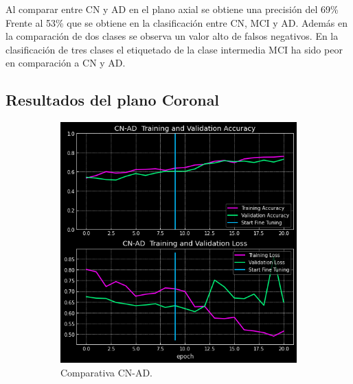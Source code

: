 Al comparar entre CN y AD en el plano axial se obtiene una precisión del 69\%
Frente al 53\% que se obtiene en la clasificación entre CN, MCI y AD. Además  en la comparación de dos clases se
observa un valor alto de falsos negativos.
En la clasificación de tres clases el etiquetado de la clase intermedia MCI ha sido  peor en comparación a CN y AD.


\subsection{Resultados del plano Coronal}\label{subsec:resultados-del-plano-coronal}

\begin{figure}[H]
    \centering
    \begin{subfigure}{0.4\textwidth}
        \includegraphics[width=\textwidth]{./imgs/resultados/coronal/CN_AD_output_CORONAL}
        \caption{Comparativa CN-AD. }
        \label{fig:coronal-cn-ad}
    \end{subfigure}
    \hspace*{\fill}
    \begin{subfigure}{0.4\textwidth}

\end{subfigure}
\end{figure}
